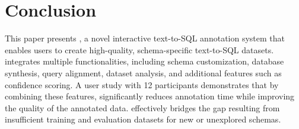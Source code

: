 \section{Conclusion}
This paper presents {\tool}, a novel interactive text-to-SQL annotation system that enables users to create high-quality, schema-specific text-to-SQL datasets.
{\tool} integrates multiple functionalities, including schema customization, database synthesis, query alignment, dataset analysis, and additional features such as confidence scoring.
A user study with 12 participants demonstrates that by combining these features, {\tool} significantly reduces annotation time while improving the quality of the annotated data.
{\tool} effectively bridges the gap resulting from insufficient training and evaluation datasets for new or unexplored schemas.